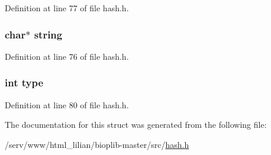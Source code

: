 Definition at line 77 of file hash.\-h.

\hypertarget{struct__hash_tab_aed1cfb225a5fb77461e7972691e68a72}{
\subsubsection[{string}]{\setlength{\rightskip}{0pt plus 5cm}char$\ast$ string}}\label{struct__hash_tab_aed1cfb225a5fb77461e7972691e68a72}


Definition at line 76 of file hash.\-h.

\hypertarget{struct__hash_tab_ac765329451135abec74c45e1897abf26}{
\subsubsection[{type}]{\setlength{\rightskip}{0pt plus 5cm}int type}}\label{struct__hash_tab_ac765329451135abec74c45e1897abf26}


Definition at line 80 of file hash.\-h.



The documentation for this struct was generated from the following file\-:\begin{DoxyCompactItemize}
\item 
/serv/www/html\-\_\-lilian/bioplib-\/master/src/\hyperlink{hash_8h}{hash.\-h}\end{DoxyCompactItemize}
